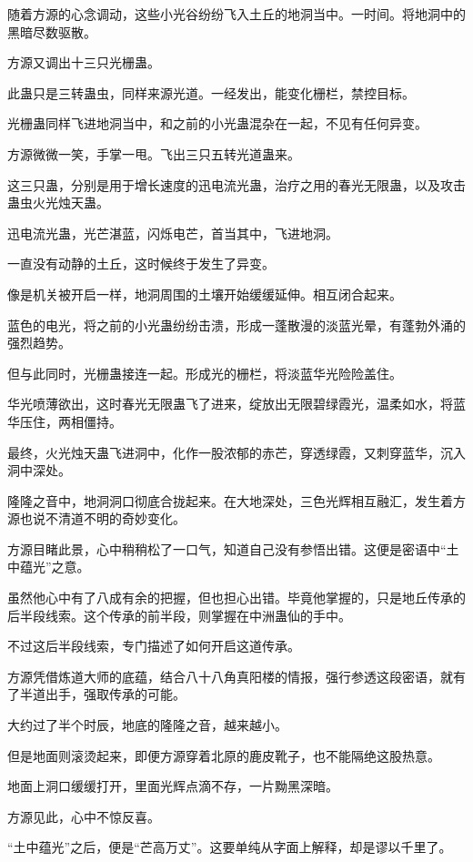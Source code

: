 \begin{this_body}
随着方源的心念调动，这些小光谷纷纷飞入土丘的地洞当中。一时间。将地洞中的黑暗尽数驱散。

方源又调出十三只光栅蛊。

此蛊只是三转蛊虫，同样来源光道。一经发出，能变化栅栏，禁控目标。

光栅蛊同样飞进地洞当中，和之前的小光蛊混杂在一起，不见有任何异变。

方源微微一笑，手掌一甩。飞出三只五转光道蛊来。

这三只蛊，分别是用于增长速度的迅电流光蛊，治疗之用的春光无限蛊，以及攻击蛊虫火光烛天蛊。

迅电流光蛊，光芒湛蓝，闪烁电芒，首当其中，飞进地洞。

一直没有动静的土丘，这时候终于发生了异变。

像是机关被开启一样，地洞周围的土壤开始缓缓延伸。相互闭合起来。

蓝色的电光，将之前的小光蛊纷纷击溃，形成一蓬散漫的淡蓝光晕，有蓬勃外涌的强烈趋势。

但与此同时，光栅蛊接连一起。形成光的栅栏，将淡蓝华光险险盖住。

华光喷薄欲出，这时春光无限蛊飞了进来，绽放出无限碧绿霞光，温柔如水，将蓝华压住，两相僵持。

最终，火光烛天蛊飞进洞中，化作一股浓郁的赤芒，穿透绿霞，又刺穿蓝华，沉入洞中深处。

隆隆之音中，地洞洞口彻底合拢起来。在大地深处，三色光辉相互融汇，发生着方源也说不清道不明的奇妙变化。

方源目睹此景，心中稍稍松了一口气，知道自己没有参悟出错。这便是密语中“土中蕴光”之意。

虽然他心中有了八成有余的把握，但也担心出错。毕竟他掌握的，只是地丘传承的后半段线索。这个传承的前半段，则掌握在中洲蛊仙的手中。

不过这后半段线索，专门描述了如何开启这道传承。

方源凭借炼道大师的底蕴，结合八十八角真阳楼的情报，强行参透这段密语，就有了半道出手，强取传承的可能。

大约过了半个时辰，地底的隆隆之音，越来越小。

但是地面则滚烫起来，即便方源穿着北原的鹿皮靴子，也不能隔绝这股热意。

地面上洞口缓缓打开，里面光辉点滴不存，一片黝黑深暗。

方源见此，心中不惊反喜。

“土中蕴光”之后，便是“芒高万丈”。这要单纯从字面上解释，却是谬以千里了。


\end{this_body}
